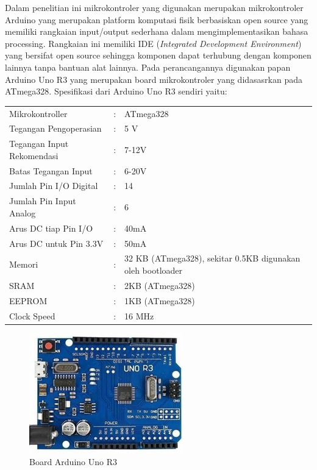Dalam penelitian ini mikrokontroler yang digunakan merupakan mikrokontroler Arduino yang merupakan
platform komputasi fisik berbasiskan open source yang memiliki rangkaian input/output sederhana
dalam mengimplementasikan bahasa processing. Rangkaian ini memiliki IDE (\textit{Integrated 
Development Environment}) yang bersifat open source sehingga komponen dapat terhubung dengan
komponen lainnya tanpa bantuan alat lainnya. Pada perancangannya digunakan papan Arduino Uno R3
yang merupakan board mikrokontroler yang didasasrkan pada ATmega328\cite{Sokop2016}. Spesifikasi
dari Arduino Uno R3 sendiri yaitu:
\begin{longtable}{p{6cm}p{3pt}p{6cm}}
    \hspace{20pt} Mikrokontroller &:& ATmega328\\
    \hspace{20pt} Tegangan Pengoperasian &:&5 V\\
    \hspace{20pt} Tegangan Input Rekomendasi &:& 7-12V\\
    \hspace{20pt} Batas Tegangan Input &:& 6-20V\\
    \hspace{20pt} Jumlah Pin I/O Digital &:& 14\\
    \hspace{20pt} Jumlah Pin Input Analog &:& 6\\
    \hspace{20pt} Arus DC tiap Pin I/O &:& 40mA\\
    \hspace{20pt} Arus DC untuk Pin 3.3V &:& 50mA\\
    \hspace{20pt} Memori &:& 32 KB (ATmega328), sekitar 0.5KB digunakan oleh bootloader\\
    \hspace{20pt} SRAM &:& 2KB (ATmega328)\\
    \hspace{20pt} EEPROM &:& 1KB (ATmega328)\\
    \hspace{20pt} Clock Speed &:& 16 MHz
\end{longtable}

\begin{figure}[H]
    \centering
    \includegraphics{Images/ArduinoUno.jpg}
    \caption{Board Arduino Uno R3}
    \label{fig:arduino}
\end{figure}


